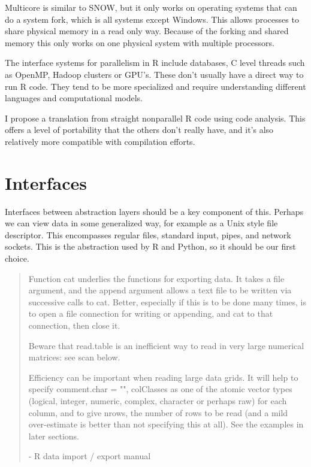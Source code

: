 \documentclass[12pt]{article}
\begin{document}
Multicore is similar to SNOW, but it only works on operating systems that can
do a system fork, which is all systems except Windows. This allows
processes to share physical memory in a read only way. Because of the
forking and shared memory this only works on one physical system with
multiple processors.

The interface systems for parallelism in R include databases, C level
threads such as OpenMP, Hadoop clusters or GPU's. These don't usually have
a direct way to run R code. They tend to be more specialized and require
understanding different languages and computational models.

I propose a translation from straight nonparallel R code using code
analysis. This offers a level of portability that the others don't really
have, and it's also relatively more compatible with compilation efforts.

\section{Interfaces}

Interfaces between abstraction layers should be a key component of this.
Perhaps we can view data in some generalized way, for example as a Unix
style file descriptor. This encompasses regular files, standard input,
pipes, and network sockets. This is the abstraction used by R and Python,
so it should be our first choice.

\begin{quote}

Function cat underlies the functions for exporting data. It takes a file
    argument, and the append argument allows a text file to be written via
    successive calls to cat. Better, especially if this is to be done many
    times, is to open a file connection for writing or appending, and cat
    to that connection, then close it.

Beware that read.table is an inefficient way to read in very large
numerical matrices: see scan below.

Efficiency can be important when reading large data grids. It will help to
    specify comment.char = "", colClasses as one of the atomic vector types
    (logical, integer, numeric, complex, character or perhaps raw) for each
    column, and to give nrows, the number of rows to be read (and a mild
    over-estimate is better than not specifying this at all). See the
    examples in later sections.

- R data import / export manual
\end{quote}
\end{document}
